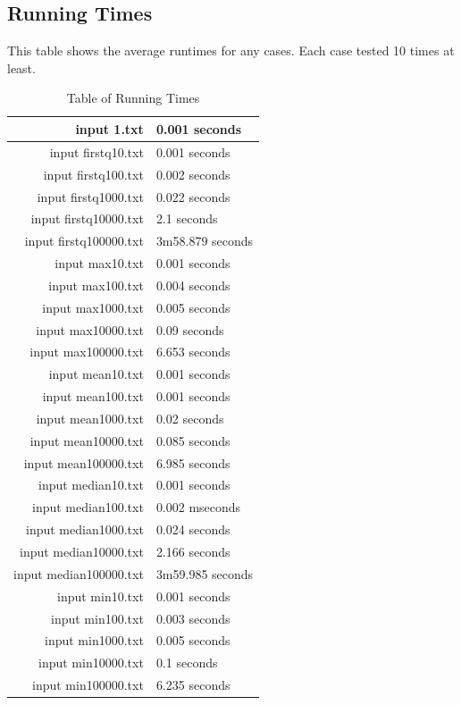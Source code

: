 \documentclass[a4paper, 12pt, titlepage]{article}
\begin{document}
\subsection{Running Times}
This table shows the average runtimes for any cases. Each case tested 10 times at least.
\begin{table}[H]
	\label{table:runningtimes}
	\caption{Table of Running Times}
	\centering
	\begin{tabular}{| r | l |}
 \hline
input 1.txt  & 0.001 seconds \\
\hline
input firstq10.txt & 0.001 seconds \\
\hline
input firstq100.txt & 0.002 seconds \\
\hline
input firstq1000.txt & 0.022 seconds\\
\hline
input firstq10000.txt & 2.1 seconds\\
\hline
input firstq100000.txt & 3m58.879 seconds\\
\hline
input max10.txt & 0.001 seconds\\
\hline
input max100.txt & 0.004 seconds\\
\hline
input max1000.txt & 0.005 seconds\\
\hline
input max10000.txt & 0.09 seconds\\
\hline
input max100000.txt & 6.653 seconds\\
\hline
input mean10.txt & 0.001 seconds\\
\hline
input mean100.txt & 0.001 seconds\\
\hline
input mean1000.txt & 0.02 seconds\\
\hline
input mean10000.txt & 0.085 seconds\\
\hline
input mean100000.txt & 6.985 seconds\\
\hline
input median10.txt & 0.001 seconds\\
\hline
input median100.txt & 0.002 mseconds\\
\hline
input median1000.txt & 0.024 seconds\\
\hline
input median10000.txt & 2.166 seconds\\
\hline
input median100000.txt & 3m59.985 seconds\\
\hline
input min10.txt & 0.001 seconds\\
\hline
input min100.txt & 0.003 seconds\\
\hline
input min1000.txt & 0.005 seconds\\
\hline
input min10000.txt& 0.1 seconds \\
\hline
input min100000.txt& 6.235 seconds \\

\end{tabular}
\end{table}
\end{document}
